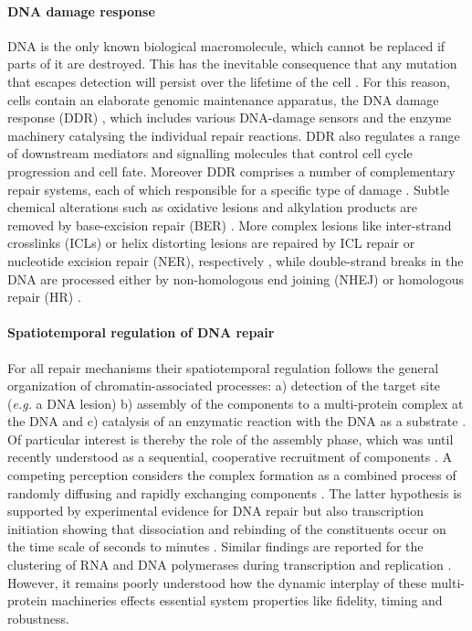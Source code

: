\paragraph{DNA damage response}    
DNA is the only known biological macromolecule, which cannot be replaced if parts of it are destroyed. This has the inevitable consequence that any mutation that escapes detection will persist over the lifetime of the cell \cite{Hoeijmakers2009,Marteijn2014}. For this reason, cells contain an elaborate genomic maintenance apparatus, the DNA damage response (DDR) \cite{Ciccia2010}, which includes various DNA-damage sensors and the enzyme machinery catalysing the individual repair reactions. DDR also regulates a range of downstream mediators and signalling molecules that control cell cycle progression and cell fate. Moreover DDR comprises a number of complementary repair systems, each of which responsible for a specific type of damage \cite{Ciccia2010,Marteijn2014}. Subtle chemical alterations such as oxidative lesions and alkylation products are removed by base-excision repair (BER) \cite{Lindahl2000,Caldecott2008}. More complex lesions like inter-strand crosslinks (ICLs) or helix distorting lesions are repaired by ICL repair or nucleotide excision repair (NER), respectively \cite{Moldovan2009,Hoeijmakers2009}, while double-strand breaks in the DNA are processed either by non-homologous end joining (NHEJ) or homologous repair (HR) \cite{Caldecott2008,West2003}. 

\paragraph{Spatiotemporal regulation of DNA repair} For all repair mechanisms their spatiotemporal regulation follows the general organization of chromatin-associated processes: a) detection of the target site (\textit{e.g.} a DNA lesion) b) assembly of the components to a multi-protein complex at the DNA and c) catalysis of an enzymatic reaction with the DNA as a substrate \cite{Hoeijmakers:2001:Nature:11357144,Gillet:2006:Chem-Rev:16464005,Dinant:2009:J-Cell-Biol:19332890,Luijsterburg2010}. Of particular interest is thereby the role of the assembly phase, which was until recently understood as a sequential, cooperative recruitment of components \cite{Volker2001}. A competing perception considers the complex formation as a combined process of randomly diffusing and rapidly exchanging components \cite{Luijsterburg2010}. The latter hypothesis is supported by experimental evidence for DNA repair but also transcription initiation showing that dissociation and rebinding of the constituents occur on the time scale of seconds to minutes \cite{Vermeulen2011,Stasevich2011}. Similar findings are reported for the clustering of RNA and DNA polymerases during transcription and replication \cite{Kuipers2011,Sonneville2012}. However, it remains poorly understood how the dynamic interplay of these multi-protein machineries effects essential system properties like fidelity, timing and robustness. 




